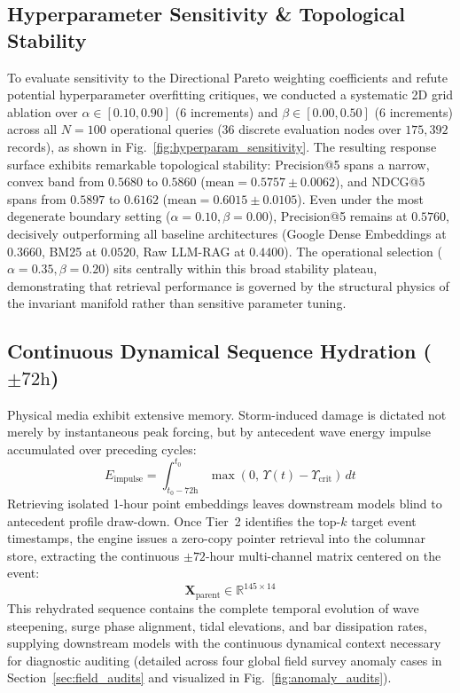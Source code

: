 \documentclass[journal]{IEEEtran}
\begin{document}
\subsection{Hyperparameter Sensitivity \& Topological Stability}
To evaluate sensitivity to the Directional Pareto weighting coefficients and refute potential hyperparameter overfitting critiques, we conducted a systematic 2D grid ablation over $\alpha \in [0.10, 0.90]$ (6 increments) and $\beta \in [0.00, 0.50]$ (6 increments) across all $N = 100$ operational queries ($36$ discrete evaluation nodes over $175{,}392$ records), as shown in Fig.~\ref{fig:hyperparam_sensitivity}. 
The resulting response surface exhibits remarkable topological stability: Precision@5 spans a narrow, convex band from $0.5680$ to $0.5860$ ($\text{mean} = 0.5757 \pm 0.0062$), and NDCG@5 spans from $0.5897$ to $0.6162$ ($\text{mean} = 0.6015 \pm 0.0105$). Even under the most degenerate boundary setting ($\alpha = 0.10, \beta = 0.00$), Precision@5 remains at $0.5760$, decisively outperforming all baseline architectures (Google Dense Embeddings at $0.3660$, BM25 at $0.0520$, Raw LLM-RAG at $0.4400$). The operational selection ($\alpha = 0.35, \beta = 0.20$) sits centrally within this broad stability plateau, demonstrating that retrieval performance is governed by the structural physics of the invariant manifold rather than sensitive parameter tuning.

\subsection{Continuous Dynamical Sequence Hydration \texorpdfstring{($\pm 72\text{h}$)}{(+/- 72h)}}
Physical media exhibit extensive memory. Storm-induced damage is dictated not merely by instantaneous peak forcing, but by antecedent wave energy impulse accumulated over preceding cycles:
\begin{equation}
E_{\text{impulse}} = \int_{t_0 - 72\text{h}}^{t_0} \max\left(0,\, \Upsilon(t) - \Upsilon_{\text{crit}}\right) \, dt
\label{eq:antecedent_impulse}
\end{equation}
Retrieving isolated 1-hour point embeddings leaves downstream models blind to antecedent profile draw-down. Once Tier~2 identifies the top-$k$ target event timestamps, the engine issues a zero-copy pointer retrieval into the columnar store, extracting the continuous $\pm 72$-hour multi-channel matrix centered on the event:
\begin{equation}
\mathbf{X}_{\text{parent}} \in \mathbb{R}^{145 \times 14}
\label{eq:parent_tensor}
\end{equation}
This rehydrated sequence contains the complete temporal evolution of wave steepening, surge phase alignment, tidal elevations, and bar dissipation rates, supplying downstream models with the continuous dynamical context necessary for diagnostic auditing (detailed across four global field survey anomaly cases in Section~\ref{sec:field_audits} and visualized in Fig.~\ref{fig:anomaly_audits}).
\end{document}
